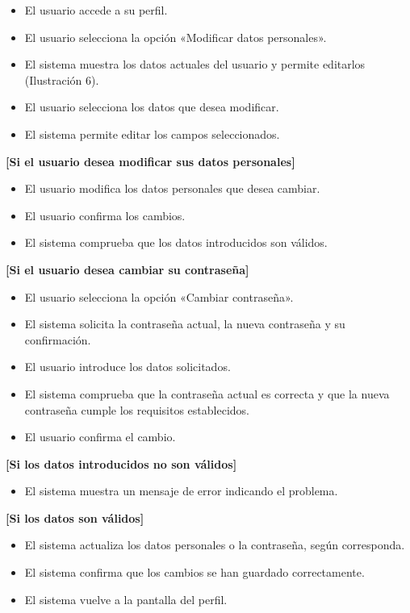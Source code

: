 \documentclass[a4paper,11pt]{article}
\newcommand{\si}[1]{\par\vspace{0.15cm}\noindent\textbf{[#1]}\par\nobreak}
\begin{document}
  {\begin{itemize}
    \item El usuario accede a su perfil.
    \item El usuario selecciona la opción «Modificar datos personales».
    \item El sistema muestra los datos actuales del usuario y permite editarlos (Ilustración 6).
    \item El usuario selecciona los datos que desea modificar.
    \item El sistema permite editar los campos seleccionados.
  \end{itemize}

  \si{Si el usuario desea modificar sus datos personales}

  \begin{itemize}
    \item El usuario modifica los datos personales que desea cambiar.
    \item El usuario confirma los cambios.
    \item El sistema comprueba que los datos introducidos son válidos.
  \end{itemize}

  \si{Si el usuario desea cambiar su contraseña}

  \begin{itemize}
    \item El usuario selecciona la opción «Cambiar contraseña».
    \item El sistema solicita la contraseña actual, la nueva contraseña y su confirmación.
    \item El usuario introduce los datos solicitados.
    \item El sistema comprueba que la contraseña actual es correcta y que la nueva contraseña cumple los requisitos establecidos.
    \item El usuario confirma el cambio.
  \end{itemize}

  \si{Si los datos introducidos no son válidos}

  \begin{itemize}
    \item El sistema muestra un mensaje de error indicando el problema.
  \end{itemize}

  \si{Si los datos son válidos}

  \begin{itemize}
    \item El sistema actualiza los datos personales o la contraseña, según corresponda.
    \item El sistema confirma que los cambios se han guardado correctamente.
    \item El sistema vuelve a la pantalla del perfil.
  \end{itemize}}
\end{document}
